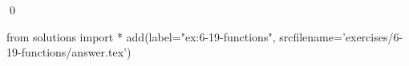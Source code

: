 
\begin{ex}
  \label{ex:6-19-functions}
  
  \qed
\end{ex}
\begin{python0}
from solutions import *
add(label="ex:6-19-functions",
    srcfilename='exercises/6-19-functions/answer.tex')
\end{python0}

